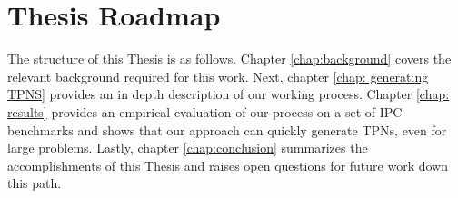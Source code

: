 \section{Thesis Roadmap}
\label{intro: Thesis Roadmap}

The structure of this Thesis is as follows.
Chapter \ref{chap:background} covers the relevant background required for this work.
Next, chapter \ref{chap: generating TPNS} provides an in depth description of our working process.
Chapter \ref{chap: results} provides an empirical evaluation of our process on a set of IPC benchmarks and shows that our approach can quickly generate TPNs, even for large problems.
Lastly, chapter \ref{chap:conclusion} summarizes the accomplishments of this Thesis and raises open questions for future work down this path.
